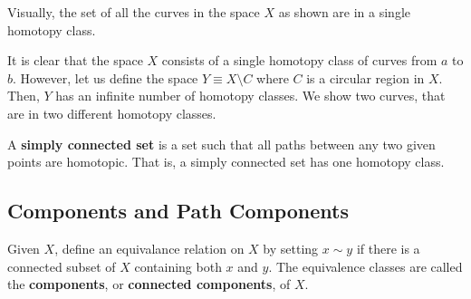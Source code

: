     Visually, the set of all the curves in the space $X$ as shown are in a single homotopy class.
    \begin{center}
    \end{center}
    It is clear that the space $X$ consists of a single homotopy class of curves from $a$ to $b$. However, let us define the space $Y \equiv X \setminus C$ where $C$ is a circular region in $X$. Then, $Y$ has an infinite number of homotopy classes. We show two curves, that are in two different homotopy classes. 
    \begin{center}
    \end{center}

    \begin{definition}
    A \textbf{simply connected set} is a set such that all paths between any two given points are homotopic. That is, a simply connected set has one homotopy class. 
    \end{definition}

  \subsection{Components and Path Components}

    \begin{definition}
    Given $X$, define an equivalance relation on $X$ by setting $x \sim y$ if there is a connected subset of $X$ containing both $x$ and $y$. The equivalence classes are called the \textbf{components}, or \textbf{connected components}, of $X$. 
    \end{definition}

